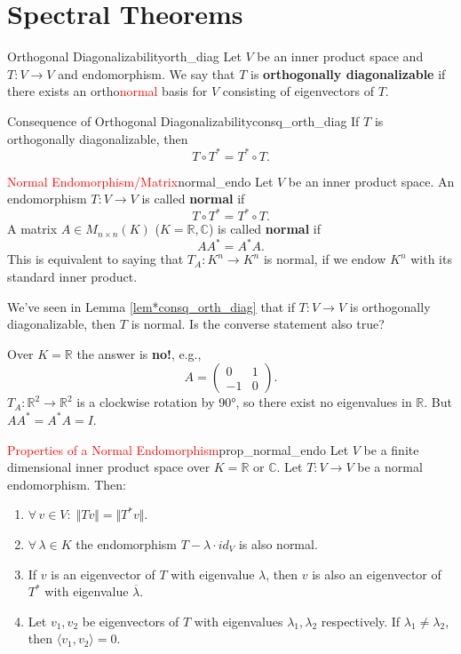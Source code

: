 % 
%
%
%

\section{Spectral Theorems}

\begin{definition}{Orthogonal Diagonalizability}{orth_diag}
	Let $V$ be an inner product space and $T:V \to V$ and endomorphism. We say that $T$ is \textbf{orthogonally diagonalizable} if there exists an ortho\textcolor{red}{normal} basis for $V$ consisting of eigenvectors of $T$.
\end{definition}

\begin{lemma}{Consequence of Orthogonal Diagonalizability}{consq_orth_diag}
	If $T$ is orthogonally diagonalizable, then 
	\[
		T\circ T^* = T^* \circ T.
	\]
\end{lemma}

\begin{definition}{\textcolor{red}{Normal Endomorphism/Matrix}}{normal_endo}
	Let $V$ be an inner product space. An endomorphism $T:V \to V$ is called \textbf{normal} if 
	\[
		T \circ T^* = T^* \circ T.
	\]
	A matrix $A \in M_{n \times n}(K)$ ($K = \mathbb{R}, \mathbb{C}$) is called \textbf{normal} if 
	\[
		A A^* = A^* A.
	\]
	This is equivalent to saying that $T_A:K^n \to K^n$ is normal, if we endow $K^n$ with its standard inner product. 
\end{definition}

We've seen in Lemma \ref{lem*consq_orth_diag} that if $T:V \to V$ is orthogonally diagonalizable, then $T$ is normal. Is the converse statement also true?

Over $K = \mathbb{R}$ the answer is \textbf{no!}, e.g., 
\[
	A = \begin{pmatrix}
		0 & 1\\
		-1 & 0
	\end{pmatrix}.
\]
$T_A:\mathbb{R}^2 \to \mathbb{R}^2$ is a clockwise rotation by 90°, so there exist no eigenvalues in $\mathbb{R}$. But $AA^* = A^*A = I$.


\begin{lemma}{\textcolor{red}{Properties of a Normal Endomorphism}}{prop_normal_endo}
	Let $V$ be a finite dimensional inner product space over $K = \mathbb{R}$ or $\mathbb{C}$. Let $T:V \to V$ be a normal endomorphism. Then:
	\begin{enumerate}
		\item $\forall\,  v \in V : \; \Vert Tv \Vert = \Vert T^*v \Vert$.
		\item $\forall \, \lambda \in K$ the endomorphism $T - \lambda \cdot id_V$ is also normal.
		\item If $v$ is an eigenvector of $T$ with eigenvalue $\lambda$, then $v$ is also an eigenvector of $T^*$ with eigenvalue $\overline{\lambda}$.
		\item Let $v_1, v_2$ be eigenvectors of $T$ with eigenvalues $\lambda_1, \lambda_2$ respectively. If $\lambda_1 \neq \lambda_2$, then $\langle v_1, v_2\rangle = 0$.
	\end{enumerate}
\end{lemma}

